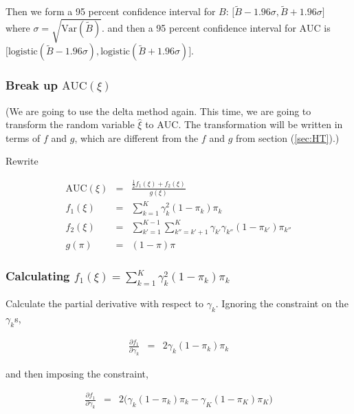 \documentclass[11pt]{article}
\begin{document}
Then we form a 95 percent confidence interval for $B$: 
$\bigl[\tilde{B} - 1.96 \sigma, \tilde{B} + 1.96 \sigma\bigr]$ where
$\sigma = \sqrt{\mbox{Var}(\tilde{B})}$. and then a 95 percent
confidence interval for $\mbox{AUC}$ is 
$\bigl[\mbox{logistic}(\tilde{B} - 1.96 \sigma),
\mbox{logistic}(\tilde{B} + 1.96 \sigma)\bigr]$.



\subsubsection{Break up $\mbox{AUC}(\xi)$}

(We are going to use the delta method again.  This time, we are going
to transform the random variable $\hat{\xi}$ to $\mbox{AUC}$.  The
transformation will be written in terms of $f$ and $g$, which are
different from the $f$ and $g$ from section (\ref{sec:HT}).)

Rewrite

\begin{eqnarray}
\mbox{AUC}(\xi) & = & \frac{\frac{1}{2}f_1(\xi) + f_2(\xi)}{g(\xi)} \\
f_1(\xi) & = & \sum_{k=1}^K \gamma_{k}^2 (1 - \pi_{k}) \pi_{k} \\
f_2(\xi) & = & 
                \sum_{k'=1}^{K-1}\sum_{k''=k'+1}^K \gamma_{k'} \gamma_{k''}
               (1-\pi_{k'}) \pi_{k''}\\
g(\pi) & = & (1-\pi)\pi
\end{eqnarray}

\subsubsection{Calculating $f_1(\xi) = \sum_{k=1}^K \gamma_{k}^2 (1 - \pi_{k})
  \pi_{k}$}

Calculate the partial derivative with respect to $\gamma_k$.  Ignoring the
constraint on the $\gamma_k$s, 

\begin{eqnarray}
\frac{\partial f_1}{\partial \gamma_{k} } & = &
                                2 \gamma_k (1-\pi_k)\pi_k
\end{eqnarray}

and then imposing the constraint,

\begin{eqnarray}
\frac{\partial f_1}{\partial \gamma_{k} } & = &
                                 2 \biggl(\gamma_k (1-\pi_k)\pi_k - \gamma_K (1-\pi_K)\pi_K\biggr)
\end{eqnarray}
\end{document}
